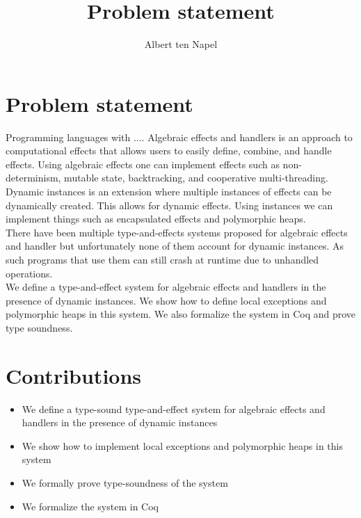 \documentclass[12pt]{article}
\title{Problem statement}
\author{Albert ten Napel}
\date{}
\begin{document}
\maketitle




\section{Problem statement}
Programming languages with .... Algebraic effects and handlers is an approach to computational effects that allows users to easily define, combine, and handle effects. Using algebraic effects one can implement effects such as non-determinism, mutable state, backtracking, and cooperative multi-threading.
Dynamic instances is an extension where multiple instances of effects can be dynamically created. This allows for dynamic effects. Using instances we can implement things such as encapsulated effects and polymorphic heaps.
\\
There have been multiple type-and-effects systems proposed for algebraic effects and handler but unfortunately none of them account for dynamic instances. As such programs that use them can still crash at runtime due to unhandled operations. \\
We define a type-and-effect system for algebraic effects and handlers in the presence of dynamic instances.
We show how to define local exceptions and polymorphic heaps in this system.
We also formalize the system in Coq and prove type soundness.

\section{Contributions}
\begin{itemize}
\item We define a type-sound type-and-effect system for algebraic effects and handlers in the presence of dynamic instances
\item We show how to implement local exceptions and polymorphic heaps in this system
\item We formally prove type-soundness of the system
\item We formalize the system in Coq
\end{itemize}
\end{document}

